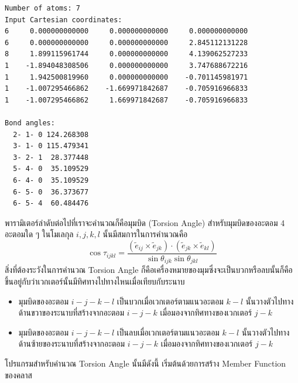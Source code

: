 \begin{lstlisting}
Number of atoms: 7
Input Cartesian coordinates:
6     0.000000000000     0.000000000000     0.000000000000
6     0.000000000000     0.000000000000     2.845112131228
8     1.899115961744     0.000000000000     4.139062527233
1    -1.894048308506     0.000000000000     3.747688672216
1     1.942500819960     0.000000000000    -0.701145981971
1    -1.007295466862    -1.669971842687    -0.705916966833
1    -1.007295466862     1.669971842687    -0.705916966833

Bond angles:
  2- 1- 0 124.268308
  3- 1- 0 115.479341
  3- 2- 1  28.377448
  5- 4- 0  35.109529
  6- 4- 0  35.109529
  6- 5- 0  36.373677
  6- 5- 4  60.484476
\end{lstlisting}

\vspace{5pt}

\noindent {}

พารามิเตอร์ลำดับต่อไปที่เราจะคำนวณก็คือมุมบิด (Torsion Angle) สำหรับมุมบิดของอะตอม 4 อะตอมใด ๆ ในโมเลกุล $i, j, k, l$ นั้นมีสมการในการคำนวณคือ
%
\begin{equation}
  \cos \tau_{ijkl}
  =
  \frac{
    (\tilde{e}_{ij} \times \tilde{e}_{jk})
    \cdot
    (\tilde{e}_{jk} \times \tilde{e}_{kl})
  }
  {
    \sin \theta_{ijk}
    \sin \theta_{jkl}
  }
\end{equation}
%
สิ่งที่ต้องระวังในการคำนวณ Torsion Angle ก็คือเครื่องหมายของมุมซึ่งจะเป็นบวกหรือลบนั้นก็คือขึ้นอยู่กับว่าเวกเตอร์นั้นมีทิศทางไปทางไหนเมื่อเทียบกับระนาบ

\begin{itemize}[topsep=0pt,noitemsep]
  \setlength\itemsep{0.5em}
  \item มุมบิดของอะตอม $i-j-k-l$ เป็นบวกเมื่อเวกเตอร์ตามแนวอะตอม $k-l$ นั้นวางตัวไปทางด้านขวาของระนาบที่สร้างจากอะตอม $i-j-k$ เมื่อมองจากทิศทางของเวกเตอร์ $j-k$

  \item มุมบิดของอะตอม $i-j-k-l$ เป็นลบเมื่อเวกเตอร์ตามแนวอะตอม $k-l$ นั้นวางตัวไปทางด้านซ้ายของระนาบที่สร้างจากอะตอม $i-j-k$ เมื่อมองจากทิศทางของเวกเตอร์ $j-k$
\end{itemize}

\vspace{5pt}

โปรแกรมสำหรับคำนวณ Torsion Angle นั้นมีดังนี้ เริ่มต้นด้วยการสร้าง Member Function ของคลาส 

\vspace{5pt}

